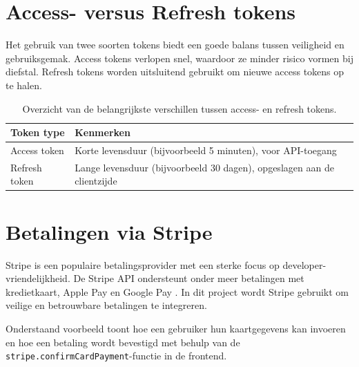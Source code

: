 \section{Access- versus Refresh tokens}

Het gebruik van twee soorten tokens biedt een goede balans tussen veiligheid en gebruiksgemak. Access tokens verlopen snel, waardoor ze minder risico vormen bij diefstal. Refresh tokens worden uitsluitend gebruikt om nieuwe access tokens op te halen.

\begin{table}[h]
\centering
\begin{tabular}{l l}
\toprule
\textbf{Token type} & \textbf{Kenmerken} \\
\midrule
Access token & Korte levensduur (bijvoorbeeld 5 minuten), voor API-toegang \\
Refresh token & Lange levensduur (bijvoorbeeld 30 dagen), opgeslagen aan de clientzijde \\
\bottomrule
\end{tabular}
\caption[Verschillen tussen access en refresh tokens.]{Overzicht van de belangrijkste verschillen tussen access- en refresh tokens.}
\end{table}

\section{Betalingen via Stripe}

Stripe is een populaire betalingsprovider met een sterke focus op developer-vriendelijkheid. De Stripe API ondersteunt onder meer betalingen met kredietkaart, Apple Pay en Google Pay \autocite{StripeDocs2024}. In dit project wordt Stripe gebruikt om veilige en betrouwbare betalingen te integreren.

Onderstaand voorbeeld toont hoe een gebruiker hun kaartgegevens kan invoeren en hoe een betaling wordt bevestigd met behulp van de \texttt{stripe.confirmCardPayment}-functie in de frontend.

